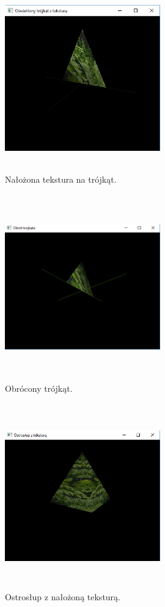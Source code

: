 \documentclass[polish,polish,a4paper]{article}
\begin{document}
    \begin{figure}[h!]
      \centering
      \includegraphics[width=0.6\textwidth,height=8cm]{oswietlonytrojkattekstura.png}
      \caption{Nałożona tekstura na trójkąt.}
      \label{fig:zrzut1}
    \end{figure}

    \begin{figure}[h!]
      \centering
      \includegraphics[width=0.6\textwidth,height=8cm]{obrottrojkata.png}
      \caption{Obrócony trójkąt.}
      \label{fig:zrzut1}
    \end{figure}

    \begin{figure}[h!]
      \centering
      \includegraphics[width=0.6\textwidth,height=8cm]{ostroslupztekstura.png}
      \caption{Ostrosłup z nałożoną teksturą.}
      \label{fig:zrzut1}
    \end{figure}
    
\end{document}
